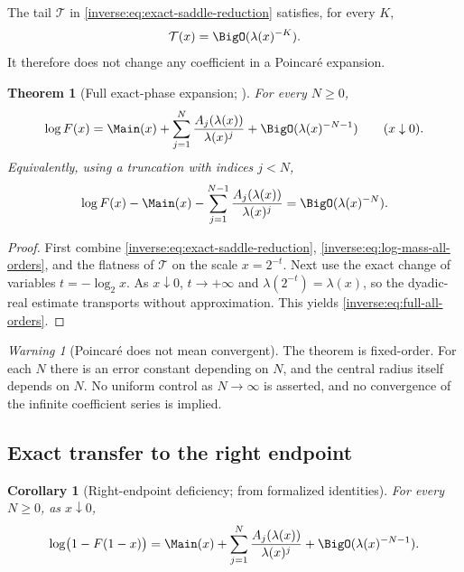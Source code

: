 \documentclass[11pt,oneside]{article}
\newtheorem{theorem}{Theorem}[section]
\newtheorem{corollary}[corollary]{Corollary}
\theoremstyle{definition}
\theoremstyle{remark}
\newtheorem{warning}[warning]{Warning}
\begin{document}
The tail $\mathcal T$ in \eqref{inverse:eq:exact-saddle-reduction} satisfies, for
every $K$,
\[
 \mathcal T(x)=\BigO(\lambda(x)^{-K}).
\]
It therefore does not change any coefficient in a Poincar\'e expansion.

\begin{theorem}[Full exact-phase expansion; \Formalized]
\label{inverse:thm:full-all-orders}
For every $N\geq0$,
\begin{equation}
 \log F(x)
 =\Main(x)+
   \sum_{j=1}^{N}\frac{A_j(\lambda(x))}{\lambda(x)^j}
   +\BigO(\lambda(x)^{-N-1})
 \qquad(x\downarrow0). \label{inverse:eq:full-all-orders}
\end{equation}
Equivalently, using a truncation with indices $j<N$,
\[
 \log F(x)-\Main(x)-
 \sum_{j=1}^{N-1}\frac{A_j(\lambda(x))}{\lambda(x)^j}
 =\BigO(\lambda(x)^{-N}).
\]
\end{theorem}

\begin{proof}
First combine \eqref{inverse:eq:exact-saddle-reduction},
\eqref{inverse:eq:log-mass-all-orders}, and the flatness of $\mathcal T$ on the
scale $x=2^{-t}$.  Next use the exact change of variables
$t=-\log_2x$.  As $x\downarrow0$, $t\to+\infty$ and
$\lambda(2^{-t})=\lambda(x)$, so the dyadic-real estimate transports
without approximation.  This yields \eqref{inverse:eq:full-all-orders}.
\end{proof}

\begin{warning}[Poincar\'e does not mean convergent]
The theorem is fixed-order.  For each $N$ there is an error constant
depending on $N$, and the central radius itself depends on $N$.  No
uniform control as $N\to\infty$ is asserted, and no convergence of the
infinite coefficient series is implied.
\end{warning}

\subsection{Exact transfer to the right endpoint}

\begin{corollary}[Right-endpoint deficiency; \Derived{} from formalized identities]
\label{inverse:cor:right-endpoint-all-orders}
For every \(N\geq0\), as \(x\downarrow0\),
\begin{equation}
 \log\bigl(1-F(1-x)\bigr)
 =\Main(x)+
   \sum_{j=1}^{N}\frac{A_j(\lambda(x))}{\lambda(x)^j}
   +\BigO(\lambda(x)^{-N-1}).
 \label{inverse:eq:right-endpoint-all-orders}
\end{equation}
\end{corollary}
\end{document}
